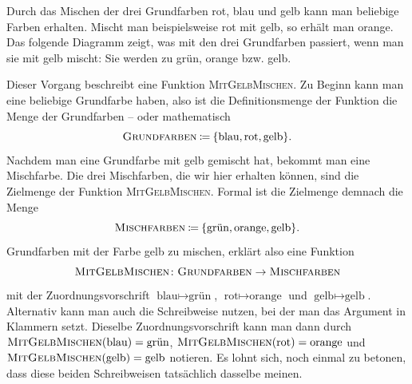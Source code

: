 \documentclass[../../main.tex]{subfiles}
\begin{document}
\begin{example}{}
    Durch das Mischen der drei Grundfarben rot, blau und gelb kann man beliebige Farben erhalten. Mischt man beispielsweise rot mit gelb, so erhält man orange. Das folgende Diagramm zeigt, was mit den drei Grundfarben passiert, wenn man sie mit gelb mischt: Sie werden zu grün, orange bzw. gelb.
    \begin{center}
    \end{center}
    Dieser Vorgang beschreibt eine Funktion \textsc{MitGelbMischen}. Zu Beginn kann man eine beliebige Grundfarbe haben, also ist die Definitionsmenge der Funktion die Menge der Grundfarben -- oder mathematisch \[\textsc{Grundfarben}\mathbin{\coloneqq}\{\text{blau},\text{rot},\text{gelb}\}.\]
    Nachdem man eine Grundfarbe mit gelb gemischt hat, bekommt man eine Mischfarbe. Die drei Mischfarben, die wir hier erhalten können, sind die Zielmenge der Funktion \textsc{MitGelbMischen}. Formal ist die Zielmenge demnach die Menge \[\textsc{Mischfarben}\mathbin{\coloneqq}\{\text{grün},\text{orange},\text{gelb}\}.\]
    Grundfarben mit der Farbe gelb zu mischen, erklärt also eine Funktion \[\textsc{MitGelbMischen}\colon\textsc{Grundfarben}\rightarrow\textsc{Mischfarben}\] mit der Zuordnungsvorschrift $\text{blau}\mapsto\text{grün}$, $\text{rot}\mapsto\text{orange}$ und $\text{gelb}\mapsto\text{gelb}$. Alternativ kann man auch die Schreibweise nutzen, bei der man das Argument in Klammern setzt. Dieselbe Zuordnungsvorschrift kann man dann durch $\textsc{MitGelbMischen}(\text{blau})=\text{grün}$, $\textsc{MitGelbMischen}(\text{rot})=\text{orange}$ und $\textsc{MitGelbMischen}(\text{gelb})=\text{gelb}$ notieren. Es lohnt sich, noch einmal zu betonen, dass diese beiden Schreibweisen tatsächlich dasselbe meinen.
\end{example}

\end{document}
